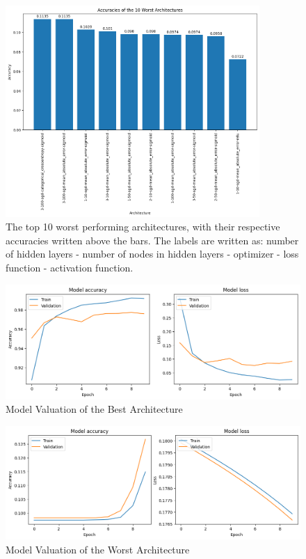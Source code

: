\documentclass[a4paper,11pt]{article}
\theoremstyle{plain} %
\theoremstyle{definition} %
\theoremstyle{remark} %
\begin{document}
\begin{figure}[h]
	\centering 
	\includegraphics[width=0.86\textwidth, angle=0]{worse.png}	
	\caption{The top 10 worst performing architectures, with their respective accuracies written above the bars. The labels are written as: number of hidden layers - number of nodes in hidden layers - optimizer - loss function - activation function.} 
	\label{worst}%
\end{figure}

\begin{figure}[h]
	\centering 
	\includegraphics[width=1\textwidth, angle=0]{bests.png}	
	\caption{Model Valuation of the Best Architecture} 
	\label{bests}%
\end{figure}

\begin{figure}[h]
	\centering 
	\includegraphics[width=1\textwidth, angle=0]{worsts.png}	
	\caption{Model Valuation of the Worst Architecture} 
	\label{worsts}%
\end{figure}
\end{document}
